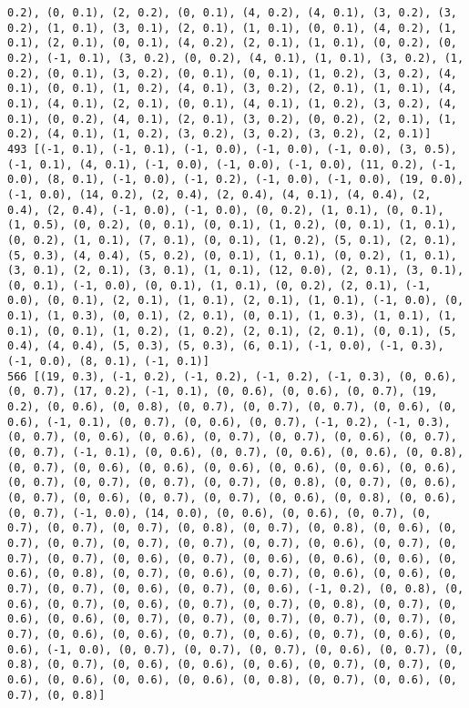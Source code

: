 \documentclass[11pt]{article}
\begin{document}
\begin{Verbatim}[commandchars=\\\{\}]
0.2), (0, 0.1), (2, 0.2), (0, 0.1), (4, 0.2), (4, 0.1), (3, 0.2), (3, 0.2), (1, 0.1), (3, 0.1), (2, 0.1), (1, 0.1), (0, 0.1), (4, 0.2), (1, 0.1), (2, 0.1), (0, 0.1), (4, 0.2), (2, 0.1), (1, 0.1), (0, 0.2), (0, 0.2), (-1, 0.1), (3, 0.2), (0, 0.2), (4, 0.1), (1, 0.1), (3, 0.2), (1, 0.2), (0, 0.1), (3, 0.2), (0, 0.1), (0, 0.1), (1, 0.2), (3, 0.2), (4, 0.1), (0, 0.1), (1, 0.2), (4, 0.1), (3, 0.2), (2, 0.1), (1, 0.1), (4, 0.1), (4, 0.1), (2, 0.1), (0, 0.1), (4, 0.1), (1, 0.2), (3, 0.2), (4, 0.1), (0, 0.2), (4, 0.1), (2, 0.1), (3, 0.2), (0, 0.2), (2, 0.1), (1, 0.2), (4, 0.1), (1, 0.2), (3, 0.2), (3, 0.2), (3, 0.2), (2, 0.1)]
493 [(-1, 0.1), (-1, 0.1), (-1, 0.0), (-1, 0.0), (-1, 0.0), (3, 0.5), (-1, 0.1), (4, 0.1), (-1, 0.0), (-1, 0.0), (-1, 0.0), (11, 0.2), (-1, 0.0), (8, 0.1), (-1, 0.0), (-1, 0.2), (-1, 0.0), (-1, 0.0), (19, 0.0), (-1, 0.0), (14, 0.2), (2, 0.4), (2, 0.4), (4, 0.1), (4, 0.4), (2, 0.4), (2, 0.4), (-1, 0.0), (-1, 0.0), (0, 0.2), (1, 0.1), (0, 0.1), (1, 0.5), (0, 0.2), (0, 0.1), (0, 0.1), (1, 0.2), (0, 0.1), (1, 0.1), (0, 0.2), (1, 0.1), (7, 0.1), (0, 0.1), (1, 0.2), (5, 0.1), (2, 0.1), (5, 0.3), (4, 0.4), (5, 0.2), (0, 0.1), (1, 0.1), (0, 0.2), (1, 0.1), (3, 0.1), (2, 0.1), (3, 0.1), (1, 0.1), (12, 0.0), (2, 0.1), (3, 0.1), (0, 0.1), (-1, 0.0), (0, 0.1), (1, 0.1), (0, 0.2), (2, 0.1), (-1, 0.0), (0, 0.1), (2, 0.1), (1, 0.1), (2, 0.1), (1, 0.1), (-1, 0.0), (0, 0.1), (1, 0.3), (0, 0.1), (2, 0.1), (0, 0.1), (1, 0.3), (1, 0.1), (1, 0.1), (0, 0.1), (1, 0.2), (1, 0.2), (2, 0.1), (2, 0.1), (0, 0.1), (5, 0.4), (4, 0.4), (5, 0.3), (5, 0.3), (6, 0.1), (-1, 0.0), (-1, 0.3), (-1, 0.0), (8, 0.1), (-1, 0.1)]
566 [(19, 0.3), (-1, 0.2), (-1, 0.2), (-1, 0.2), (-1, 0.3), (0, 0.6), (0, 0.7), (17, 0.2), (-1, 0.1), (0, 0.6), (0, 0.6), (0, 0.7), (19, 0.2), (0, 0.6), (0, 0.8), (0, 0.7), (0, 0.7), (0, 0.7), (0, 0.6), (0, 0.6), (-1, 0.1), (0, 0.7), (0, 0.6), (0, 0.7), (-1, 0.2), (-1, 0.3), (0, 0.7), (0, 0.6), (0, 0.6), (0, 0.7), (0, 0.7), (0, 0.6), (0, 0.7), (0, 0.7), (-1, 0.1), (0, 0.6), (0, 0.7), (0, 0.6), (0, 0.6), (0, 0.8), (0, 0.7), (0, 0.6), (0, 0.6), (0, 0.6), (0, 0.6), (0, 0.6), (0, 0.6), (0, 0.7), (0, 0.7), (0, 0.7), (0, 0.7), (0, 0.8), (0, 0.7), (0, 0.6), (0, 0.7), (0, 0.6), (0, 0.7), (0, 0.7), (0, 0.6), (0, 0.8), (0, 0.6), (0, 0.7), (-1, 0.0), (14, 0.0), (0, 0.6), (0, 0.6), (0, 0.7), (0, 0.7), (0, 0.7), (0, 0.7), (0, 0.8), (0, 0.7), (0, 0.8), (0, 0.6), (0, 0.7), (0, 0.7), (0, 0.7), (0, 0.7), (0, 0.7), (0, 0.6), (0, 0.7), (0, 0.7), (0, 0.7), (0, 0.6), (0, 0.7), (0, 0.6), (0, 0.6), (0, 0.6), (0, 0.6), (0, 0.8), (0, 0.7), (0, 0.6), (0, 0.7), (0, 0.6), (0, 0.6), (0, 0.7), (0, 0.7), (0, 0.6), (0, 0.7), (0, 0.6), (-1, 0.2), (0, 0.8), (0, 0.6), (0, 0.7), (0, 0.6), (0, 0.7), (0, 0.7), (0, 0.8), (0, 0.7), (0, 0.6), (0, 0.6), (0, 0.7), (0, 0.7), (0, 0.7), (0, 0.7), (0, 0.7), (0, 0.7), (0, 0.6), (0, 0.6), (0, 0.7), (0, 0.6), (0, 0.7), (0, 0.6), (0, 0.6), (-1, 0.0), (0, 0.7), (0, 0.7), (0, 0.7), (0, 0.6), (0, 0.7), (0, 0.8), (0, 0.7), (0, 0.6), (0, 0.6), (0, 0.6), (0, 0.7), (0, 0.7), (0, 0.6), (0, 0.6), (0, 0.6), (0, 0.6), (0, 0.8), (0, 0.7), (0, 0.6), (0, 0.7), (0, 0.8)]

\end{Verbatim}
\end{document}
